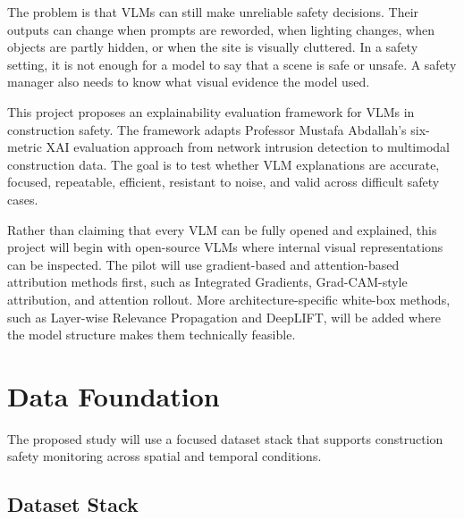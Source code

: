 \documentclass[11pt,letterpaper]{article}
\begin{document}
The problem is that VLMs can still make unreliable safety decisions. Their outputs can change when prompts are reworded, when lighting changes, when objects are partly hidden, or when the site is visually cluttered. In a safety setting, it is not enough for a model to say that a scene is safe or unsafe. A safety manager also needs to know what visual evidence the model used.

This project proposes an explainability evaluation framework for VLMs in construction safety. The framework adapts Professor Mustafa Abdallah's six-metric XAI evaluation approach from network intrusion detection to multimodal construction data. The goal is to test whether VLM explanations are accurate, focused, repeatable, efficient, resistant to noise, and valid across difficult safety cases.

Rather than claiming that every VLM can be fully opened and explained, this project will begin with open-source VLMs where internal visual representations can be inspected. The pilot will use gradient-based and attention-based attribution methods first, such as Integrated Gradients, Grad-CAM-style attribution, and attention rollout. More architecture-specific white-box methods, such as Layer-wise Relevance Propagation and DeepLIFT, will be added where the model structure makes them technically feasible.

\section{Data Foundation}

The proposed study will use a focused dataset stack that supports construction safety monitoring across spatial and temporal conditions.

\subsection{Dataset Stack}
\end{document}
